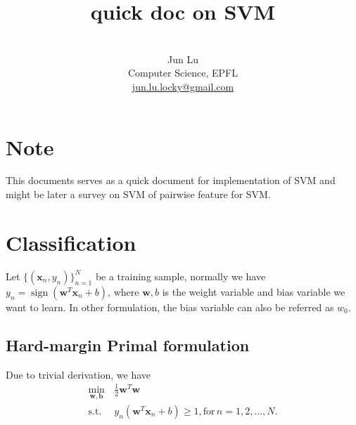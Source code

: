 \documentclass[11pt, a4paper, reqno, twoside]{scrartcl}
\theoremstyle{style}
\DeclareMathOperator*{\sign}{sign}
\newcommand{\x}{\bm{x}}
\newcommand{\wv}{\bm{w}}
\newcommand{\0}{\mathbf{0}} %
\newcommand{\bw}{\bm{w}}
\newcommand{\bx}{\bm{x}}
\newcommand{\bb}{\bm{b}}
\begin{document}
\pagestyle{fancy}



\title{quick doc on SVM}

\author{\\ Jun Lu\\
{\small Computer Science, EPFL}\\
{\small \href{mailto:jun.lu.locky@gmail.com}{jun.lu.locky@gmail.com}}}
\date{}


\maketitle


 
%

\section{Note}
This documents serves as a quick document for implementation of SVM and might be later a survey on SVM of pairwise feature for SVM.

\section{Classification}
Let $\{(\bx_n, y_n)\}_{n = 1}^N$ be a training sample, normally we have $y_n = \sign(\bw^T \bx_n + b)$, where $\bw, b$ is the weight variable and bias variable we want to learn. In other formulation, the bias variable can also be referred as $w_0$.

\subsection{Hard-margin Primal formulation}
Due to trivial derivation, we have
\begin{equation}
\begin{aligned}
\min_{\bw,\bb} \, &\frac{1}{2} \bw^T \bw\\
\mathrm{s.t. }   \,                & y_n (\bw^T \bx_n + b) \geq 1, \mathrm{for }\,  n=1, 2, \ldots, N. 
\end{aligned}
\end{equation}
\end{document}
